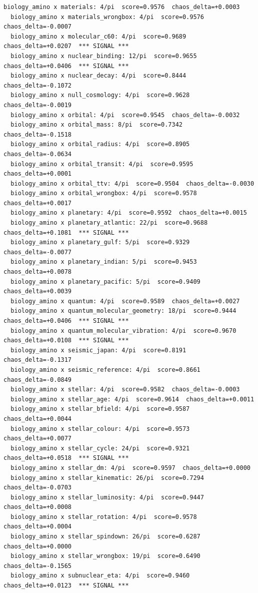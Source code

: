 \documentclass[11pt, letterpaper, openany]{book}
\begin{document}
\begin{empiricalbox}
\begin{lstlisting}[style=terminal]
  biology_amino x materials: 4/pi  score=0.9576  chaos_delta=+0.0003
  biology_amino x materials_wrongbox: 4/pi  score=0.9576  chaos_delta=-0.0007
  biology_amino x molecular_c60: 4/pi  score=0.9689  chaos_delta=+0.0207  *** SIGNAL ***
  biology_amino x nuclear_binding: 12/pi  score=0.9655  chaos_delta=+0.0406  *** SIGNAL ***
  biology_amino x nuclear_decay: 4/pi  score=0.8444  chaos_delta=-0.1072
  biology_amino x null_cosmology: 4/pi  score=0.9628  chaos_delta=-0.0019
  biology_amino x orbital: 4/pi  score=0.9545  chaos_delta=-0.0032
  biology_amino x orbital_mass: 8/pi  score=0.7342  chaos_delta=-0.1518
  biology_amino x orbital_radius: 4/pi  score=0.8905  chaos_delta=-0.0634
  biology_amino x orbital_transit: 4/pi  score=0.9595  chaos_delta=+0.0001
  biology_amino x orbital_ttv: 4/pi  score=0.9504  chaos_delta=-0.0030
  biology_amino x orbital_wrongbox: 4/pi  score=0.9578  chaos_delta=+0.0017
  biology_amino x planetary: 4/pi  score=0.9592  chaos_delta=+0.0015
  biology_amino x planetary_atlantic: 22/pi  score=0.9688  chaos_delta=+0.1081  *** SIGNAL ***
  biology_amino x planetary_gulf: 5/pi  score=0.9329  chaos_delta=-0.0077
  biology_amino x planetary_indian: 5/pi  score=0.9453  chaos_delta=+0.0078
  biology_amino x planetary_pacific: 5/pi  score=0.9409  chaos_delta=+0.0039
  biology_amino x quantum: 4/pi  score=0.9589  chaos_delta=+0.0027
  biology_amino x quantum_molecular_geometry: 18/pi  score=0.9444  chaos_delta=+0.0406  *** SIGNAL ***
  biology_amino x quantum_molecular_vibration: 4/pi  score=0.9670  chaos_delta=+0.0108  *** SIGNAL ***
  biology_amino x seismic_japan: 4/pi  score=0.8191  chaos_delta=-0.1317
  biology_amino x seismic_reference: 4/pi  score=0.8661  chaos_delta=-0.0849
  biology_amino x stellar: 4/pi  score=0.9582  chaos_delta=-0.0003
  biology_amino x stellar_age: 4/pi  score=0.9614  chaos_delta=+0.0011
  biology_amino x stellar_bfield: 4/pi  score=0.9587  chaos_delta=+0.0044
  biology_amino x stellar_colour: 4/pi  score=0.9573  chaos_delta=+0.0077
  biology_amino x stellar_cycle: 24/pi  score=0.9321  chaos_delta=+0.0518  *** SIGNAL ***
  biology_amino x stellar_dm: 4/pi  score=0.9597  chaos_delta=+0.0000
  biology_amino x stellar_kinematic: 26/pi  score=0.7294  chaos_delta=-0.0703
  biology_amino x stellar_luminosity: 4/pi  score=0.9447  chaos_delta=+0.0008
  biology_amino x stellar_rotation: 4/pi  score=0.9578  chaos_delta=+0.0004
  biology_amino x stellar_spindown: 26/pi  score=0.6287  chaos_delta=+0.0000
  biology_amino x stellar_wrongbox: 19/pi  score=0.6490  chaos_delta=-0.1565
  biology_amino x subnuclear_eta: 4/pi  score=0.9460  chaos_delta=+0.0123  *** SIGNAL ***

\end{lstlisting}
\end{empiricalbox}
\end{document}
